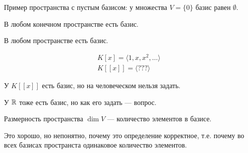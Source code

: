 \begin{remark}
    Пример пространства с пустым базисом: у множества $V = \{ 0 \}$ базис равен  $\emptyset$.
\end{remark}
\begin{consequence}
    В любом конечном пространстве есть базис.
\end{consequence}
\begin{remark}
    В любом пространстве есть базис.
\end{remark}
\begin{example}
    \begin{align*}
        K[x] = \langle 1, x, x^2,  \ldots \rangle \\
        K[[x]] = \langle ??? \rangle
    \end{align*}

    У $K[[x]]$ есть базис, но на человеческом нельзя задать.
    
    У $\mathbb{R}$ тоже есть базис, но как его задать --- вопрос.
\end{example}
\begin{definition}
    Размерность пространства $\dim V$ --- количество элементов в базисе.
\end{definition}

Это хорошо, но непонятно, почему это определение корректное, т.е. почему во всех базисах пространста одинаковое количество элементов.

